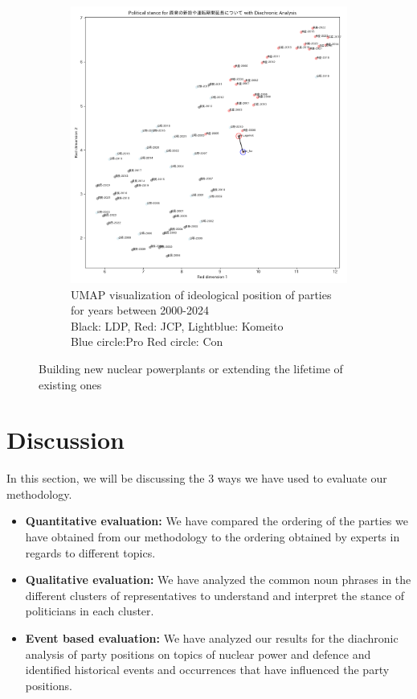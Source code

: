 \documentclass[final,5p,times,twocolumn,authoryear]{elsarticle}
\begin{document}
\begin{figure}[h]
\begin{subfigure}{0.48\textwidth}
		  \includegraphics[width=\textwidth]{figs/results/diachronic_nuclear/原発の新設や運転期間延長について_diachronic_umap.png}
		  \caption{UMAP visualization of ideological position of parties for years between 2000-2024\\\hspace{\textwidth} 
		  Black: LDP, Red: JCP, Lightblue: Komeito\\\hspace{\textwidth}
		  Blue circle:Pro Red circle: Con}
		  \label{fig:sub2}
		\end{subfigure}
	\caption{Building new nuclear powerplants or extending the lifetime of existing ones}
	\label{fig: results-diachronic-nuclear-new}
\end{figure}

\clearpage
\twocolumn

\section{Discussion}
In this section, we will be discussing the 3 ways we have used to evaluate our methodology. 
\begin{itemize}
	\item \textbf{Quantitative evaluation:} We have compared the ordering of the parties we have obtained from our methodology to the ordering obtained by experts in regards to different topics. 
	\item \textbf{Qualitative evaluation:} We have analyzed the common noun phrases in the different clusters of representatives to understand and interpret the stance of politicians in each cluster. 
	\item \textbf{Event based evaluation:} We have analyzed our results for the diachronic analysis of party positions on topics of nuclear power and defence and identified historical events and occurrences that have influenced the party positions.
\end{itemize}
\end{document}
